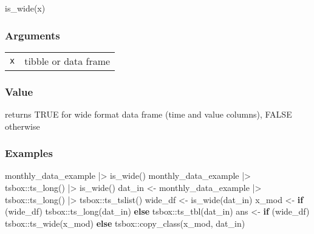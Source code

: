 \documentclass[
  letterpaper,
  DIV=11,
  numbers=noendperiod]{scrreport}
\newenvironment{Shaded}{\begin{snugshade}}{\end{snugshade}}
\newcommand{\ControlFlowTok}[1]{\textcolor[rgb]{0.00,0.23,0.31}{\textbf{#1}}}
\newcommand{\FunctionTok}[1]{\textcolor[rgb]{0.28,0.35,0.67}{#1}}
\newcommand{\NormalTok}[1]{\textcolor[rgb]{0.00,0.23,0.31}{#1}}
\newcommand{\OtherTok}[1]{\textcolor[rgb]{0.00,0.23,0.31}{#1}}
\newcommand{\SpecialCharTok}[1]{\textcolor[rgb]{0.37,0.37,0.37}{#1}}
\begin{document}
\begin{Shaded}
\begin{Highlighting}[]
\FunctionTok{is\_wide}\NormalTok{(x)}
\end{Highlighting}
\end{Shaded}

\subsubsection{Arguments}\label{arguments-53}

\begin{longtable}[]{@{}ll@{}}
\toprule\noalign{}
\endhead
\bottomrule\noalign{}
\endlastfoot
\texttt{x} & tibble or data frame \\
\end{longtable}

\subsubsection{Value}\label{value-53}

returns TRUE for wide format data frame (time and value columns), FALSE
otherwise

\subsubsection{Examples}\label{examples-53}

\begin{Shaded}
\begin{Highlighting}[]
\NormalTok{monthly\_data\_example }\SpecialCharTok{|\textgreater{}} \FunctionTok{is\_wide}\NormalTok{()}
\NormalTok{monthly\_data\_example }\SpecialCharTok{|\textgreater{}}
\NormalTok{  tsbox}\SpecialCharTok{::}\FunctionTok{ts\_long}\NormalTok{() }\SpecialCharTok{|\textgreater{}}
  \FunctionTok{is\_wide}\NormalTok{()}
\NormalTok{dat\_in }\OtherTok{\textless{}{-}}\NormalTok{ monthly\_data\_example }\SpecialCharTok{|\textgreater{}}
\NormalTok{  tsbox}\SpecialCharTok{::}\FunctionTok{ts\_long}\NormalTok{() }\SpecialCharTok{|\textgreater{}}
\NormalTok{  tsbox}\SpecialCharTok{::}\FunctionTok{ts\_tslist}\NormalTok{()}
\NormalTok{wide\_df }\OtherTok{\textless{}{-}} \FunctionTok{is\_wide}\NormalTok{(dat\_in)}
\NormalTok{x\_mod }\OtherTok{\textless{}{-}} \ControlFlowTok{if}\NormalTok{ (wide\_df) tsbox}\SpecialCharTok{::}\FunctionTok{ts\_long}\NormalTok{(dat\_in) }\ControlFlowTok{else}\NormalTok{ tsbox}\SpecialCharTok{::}\FunctionTok{ts\_tbl}\NormalTok{(dat\_in)}
\NormalTok{ans }\OtherTok{\textless{}{-}} \ControlFlowTok{if}\NormalTok{ (wide\_df) tsbox}\SpecialCharTok{::}\FunctionTok{ts\_wide}\NormalTok{(x\_mod) }\ControlFlowTok{else}\NormalTok{ tsbox}\SpecialCharTok{::}\FunctionTok{copy\_class}\NormalTok{(x\_mod, dat\_in)}
\end{Highlighting}
\end{Shaded}
\end{document}
